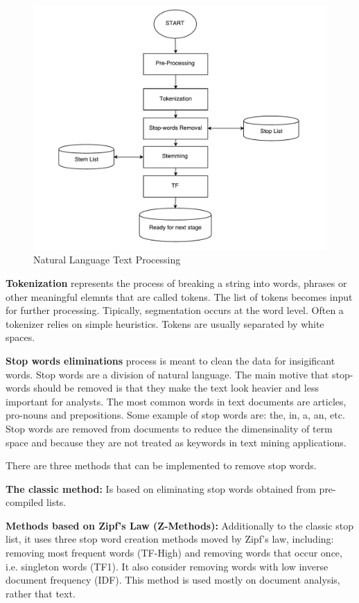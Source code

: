 \begin{figure}[!ht]
\centering
\includegraphics[width=15cm]{textmining}
\caption{Natural Language Text Processing}\label{text}
\end{figure}

\textbf{Tokenization} represents the process of breaking a string into words, phrases or other meaningful elemnts that are called tokens. The list of tokens becomes input for further processing. Tipically, segmentation occurs at the word level. Often a tokenizer relies on simple heuristics. Tokens are usually separated by white spaces. 

\textbf{Stop words eliminations} process is meant to clean the data for insigificant words. Stop words are a division of natural language. The main motive that stop-words should be removed is that they make the text look heavier and less important for analysts. The most common words in text documents are articles, pro-nouns and prepositions. Some example of stop words are: the, in, a, an, etc. Stop words are removed from documents to reduce the dimensinality of term space and because they are not treated as keywords in text mining applications. \cite{sufix}

There are three methods that can be implemented to remove stop words. 

\textbf{The classic method:} Is based on eliminating stop words obtained from pre-compiled lists.

\textbf{Methods based on Zipf's Law (Z-Methods):} Additionally to the classic stop list, it uses three stop word creation methods moved by Zipf's law, including: removing most frequent words (TF-High) and removing words that occur once, i.e. singleton words (TF1). It also consider removing words with low inverse document frequency (IDF). This method is used mostly on document analysis, rather that text.

